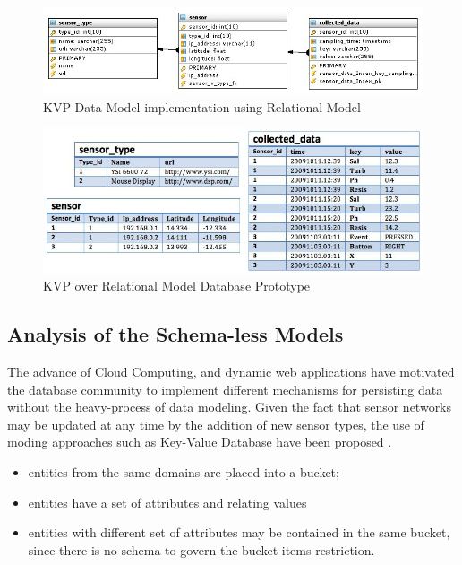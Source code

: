 \begin{figure}[!h]
  \centering
  \includegraphics[scale=0.7]{../diagrams/KVP-on-Relational-Model}
  \caption{KVP Data Model implementation using Relational Model}
  \label{fig:KVP-on-Relational-Model}
\end{figure}

\begin{figure}[!h]
  \centering
  \includegraphics[scale=0.7]{../diagrams/persistence-example-relational-kvp}
  \caption{KVP over Relational Model Database Prototype}
  \label{fig:persistence-example-relational-kvp}
\end{figure}

\subsection{Analysis of the Schema-less Models}

The advance of Cloud Computing, and dynamic web applications have motivated the
database community to implement different mechanisms for persisting data
without the heavy-process of data modeling. Given the fact that sensor networks
may be updated at any time by the addition of new sensor types, the use of
moding approaches such as Key-Value Database have been proposed \cite{db-kvp}.

\begin{itemize}
  \item entities from the same domains are placed into a bucket;
  \item entities have a set of attributes and relating values
  \item entities with different set of attributes may be contained in the same
  bucket, since there is no schema to govern the bucket items restriction.
\end{itemize}

